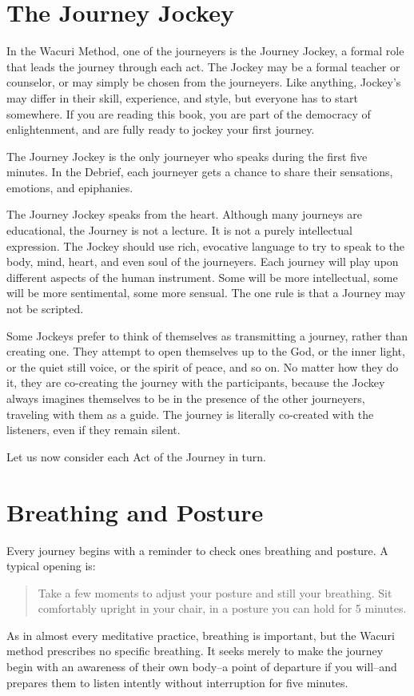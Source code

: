 \documentclass[12pt]{book}
\begin{document}
\section{The Journey Jockey}

In the Wacuri Method, one of the journeyers is the Journey Jockey, a
formal role that leads the journey through each act. The Jockey
may be a formal teacher or counselor, or may simply be chosen
from the journeyers. Like anything, Jockey's may differ in
their skill, experience, and style, but everyone has to start
somewhere. If you are reading this book, you are part of the
democracy of enlightenment, and are fully ready to jockey
your first journey.

The Journey Jockey is the only journeyer who speaks during the
first five minutes.  In the Debrief, each journeyer gets a
chance to share their sensations, emotions, and epiphanies.

The Journey Jockey speaks from the heart. Although many journeys
are educational, the Journey is not a lecture. It is not a
purely intellectual expression. The Jockey should use
rich, evocative language to try to speak to the body, mind,
heart, and even soul of the journeyers. Each journey will
play upon different aspects of the human instrument. Some
will be more intellectual, some will be more sentimental,
some more sensual. The one rule is that a Journey may not be
scripted.

Some Jockeys prefer to think of themselves as transmitting
a journey, rather than creating one. They attempt to open themselves
up to the God, or the inner light, or the quiet still voice, or
the spirit of peace, and so on. No matter how they do it,
they are co-creating the journey with the participants,
because the Jockey always imagines themselves to be in the
presence of the other journeyers, traveling with them as a guide.
The journey is literally co-created with the listeners, even
if they remain silent.

Let us now consider each Act of the Journey in turn.

\section{ Breathing and Posture}

Every journey begins with a reminder to check ones breathing and
posture. A typical opening is:
\begin{quote}
  Take a few moments to adjust your posture and still your breathing.
  Sit comfortably upright in your chair, in a posture you can
  hold for 5 minutes.
\end{quote}
As in almost every meditative practice, breathing is important, but
the Wacuri method prescribes no specific breathing. It seeks merely
to make the journey begin with an awareness of their own body--a
point of departure if you will--and prepares them to listen
intently without interruption for five minutes.
\end{document}
